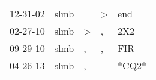 \begin{supertabular}{p{0.07\textwidth}p{0.06\textwidth}p{0.02\textwidth}p{0.02\textwidth}p{0.06\textwidth}}
 12-31-02\textsuperscript{} &  slmb\textsuperscript{} &               &  \textgreater &  end\textsuperscript{} \\
 02-27-10\textsuperscript{} &  slmb\textsuperscript{} &  \textgreater &             , &  2X2\textsuperscript{} \\
 09-29-10\textsuperscript{} &  slmb\textsuperscript{} &             , &             , &  FIR\textsuperscript{} \\
 04-26-13\textsuperscript{} &  slmb\textsuperscript{} &             , &               &                  *CQ2* \\
\end{supertabular}
